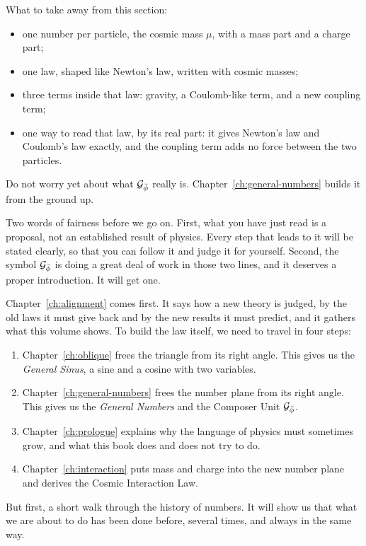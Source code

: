 \begin{plainwords}
What to take away from this section:
\begin{itemize}
  \item one number per particle, the cosmic mass $\mu$, with a mass part and a charge part;
  \item one law, shaped like Newton's law, written with cosmic masses;
  \item three terms inside that law: gravity, a Coulomb-like term, and a new coupling term;
  \item one way to read that law, by its real part: it gives Newton's law and Coulomb's law exactly, and the coupling term adds no force between the two particles.
\end{itemize}
Do not worry yet about what $\mathcal{G}_{\bar{\phi}}$ really is. Chapter~\ref{ch:general-numbers} builds it from the ground up.
\end{plainwords}

Two words of fairness before we go on. First, what you have just read is a proposal, not an established result of physics. Every step that leads to it will be stated clearly, so that you can follow it and judge it for yourself. Second, the symbol $\mathcal{G}_{\bar{\phi}}$ is doing a great deal of work in those two lines, and it deserves a proper introduction. It will get one.

Chapter~\ref{ch:alignment} comes first. It says how a new theory is judged, by the old laws it must give back and by the new results it must predict, and it gathers what this volume shows. To build the law itself, we need to travel in four steps:
\begin{enumerate}
  \item Chapter~\ref{ch:oblique} frees the triangle from its right angle. This gives us the \emph{General Sinus}, a sine and a cosine with two variables.
  \item Chapter~\ref{ch:general-numbers} frees the number plane from its right angle. This gives us the \emph{General Numbers} and the Composer Unit $\mathcal{G}_{\bar{\phi}}$.
  \item Chapter~\ref{ch:prologue} explains why the language of physics must sometimes grow, and what this book does and does not try to do.
  \item Chapter~\ref{ch:interaction} puts mass and charge into the new number plane and derives the Cosmic Interaction Law.
\end{enumerate}
But first, a short walk through the history of numbers. It will show us that what we are about to do has been done before, several times, and always in the same way.

